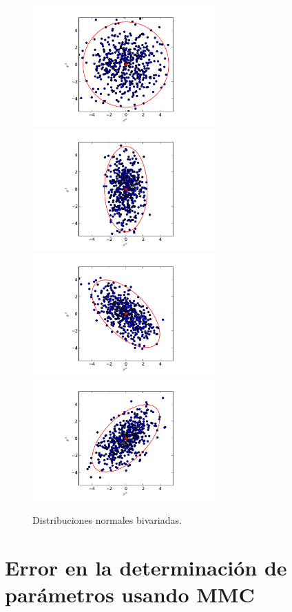\documentclass[letterpaper,11pt]{report}
\begin{document}
\begin{figure}[h!]
\begin{center}
\includegraphics[width=7cm]{figs/fig-1x1.pdf}  \includegraphics[width=7cm]{figs/fig-1x2.pdf}
\includegraphics[width=7cm]{figs/fig-1x2rot1.pdf}  \includegraphics[width=7cm]{figs/fig-1x2rot2.pdf}
\caption{Distribuciones normales bivariadas.}
\end{center}
\label{fig-dist}
\end{figure}

\section{Error en la determinación de parámetros usando MMC}
\end{document}
